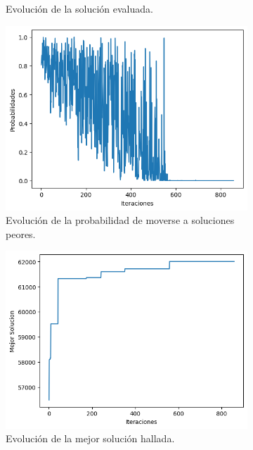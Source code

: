 \documentclass[a4paper,12pt]{article}
\begin{document}
\begin{figure}[H]
\begin{subfigure}{.45\textwidth}
			\caption{Evolución de la solución evaluada. }
		\end{subfigure}
		\hfill
		\begin{subfigure}{.45\textwidth}
			\centering
			\includegraphics[width=\textwidth]{include/ultima_ejec/prob.png}
			\caption{Evolución de la probabilidad de moverse a soluciones peores. }
		\end{subfigure}
		\hfill
		\begin{subfigure}{.45\textwidth}
			\centering
			\includegraphics[width=\textwidth]{include/ultima_ejec/f_ast.png}
			\caption{Evolución de la mejor solución hallada. }
		\end{subfigure}
		\hfill
		\begin{subfigure}{.45\textwidth}

\end{subfigure}
\end{figure}
\end{document}
